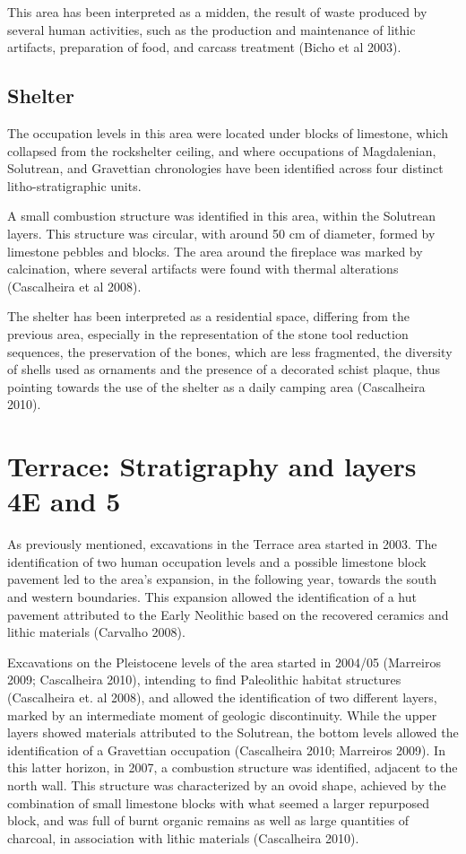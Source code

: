 \documentclass[12pt,twoside]{reedthesis}
\begin{document}
This area has been interpreted as a midden, the result of waste produced by several human activities, such as the production and maintenance of lithic artifacts, preparation of food, and carcass treatment (Bicho et al 2003).

\hypertarget{shelter}{%
\subsection{Shelter}\label{shelter}}

The occupation levels in this area were located under blocks of limestone, which collapsed from the rockshelter ceiling, and where occupations of Magdalenian, Solutrean, and Gravettian chronologies have been identified across four distinct litho-stratigraphic units.

A small combustion structure was identified in this area, within the Solutrean layers. This structure was circular, with around 50 cm of diameter, formed by limestone pebbles and blocks. The area around the fireplace was marked by calcination, where several artifacts were found with thermal alterations (Cascalheira et al 2008).

The shelter has been interpreted as a residential space, differing from the previous area, especially in the representation of the stone tool reduction sequences, the preservation of the bones, which are less fragmented, the diversity of shells used as ornaments and the presence of a decorated schist plaque, thus pointing towards the use of the shelter as a daily camping area (Cascalheira 2010).

\hypertarget{terrace-stratigraphy-and-layers-4e-and-5}{%
\section{Terrace: Stratigraphy and layers 4E and 5}\label{terrace-stratigraphy-and-layers-4e-and-5}}

As previously mentioned, excavations in the Terrace area started in 2003. The identification of two human occupation levels and a possible limestone block pavement led to the area's expansion, in the following year, towards the south and western boundaries. This expansion allowed the identification of a hut pavement attributed to the Early Neolithic based on the recovered ceramics and lithic materials (Carvalho 2008).

Excavations on the Pleistocene levels of the area started in 2004/05 (Marreiros 2009; Cascalheira 2010), intending to find Paleolithic habitat structures (Cascalheira et. al 2008), and allowed the identification of two different layers, marked by an intermediate moment of geologic discontinuity. While the upper layers showed materials attributed to the Solutrean, the bottom levels allowed the identification of a Gravettian occupation (Cascalheira 2010; Marreiros 2009). In this latter horizon, in 2007, a combustion structure was identified, adjacent to the north wall. This structure was characterized by an ovoid shape, achieved by the combination of small limestone blocks with what seemed a larger repurposed block, and was full of burnt organic remains as well as large quantities of charcoal, in association with lithic materials (Cascalheira 2010).
\end{document}
